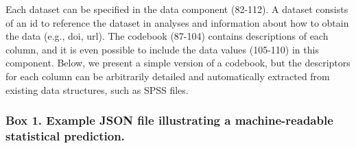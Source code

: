 \documentclass[doc,floatsintext]{apa6}
\begin{document}
Each dataset can be specified in the data component (82-112). A dataset consists of an id to reference the dataset in analyses and information about how to obtain the data (e.g., doi, url). The codebook (87-104) contains descriptions of each column, and it is even possible to include the data values (105-110) in this component. Below, we present a simple version of a codebook, but the descriptors for each column can be arbitrarily detailed and automatically extracted from existing data structures, such as SPSS files.

\hypertarget{box-1.-example-json-file-illustrating-a-machine-readable-statistical-prediction.}{%
\subsubsection{Box 1. Example JSON file illustrating a machine-readable statistical prediction.}\label{box-1.-example-json-file-illustrating-a-machine-readable-statistical-prediction.}}
\end{document}
